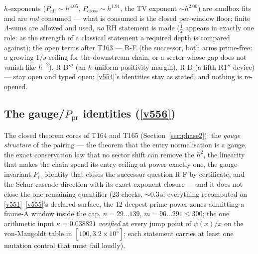 \documentclass[11pt,a4paper]{article}
\begin{document}
\begin{itemize}[leftmargin=1.5em]
$h$-exponents ($P_{\mathrm{aff}}\sim h^{3.05}$, $P_{\mathrm{cross}}\sim h^{1.91}$, the
TV exponent $\sim h^{2.00}$) are sandbox fits and are \emph{not} consumed --- what is
consumed is the closed per-window floor; finite $\Lambda$-sums are allowed and used,
\emph{no} RH statement is made ($\tfrac12$ appears in exactly one role: as the strength
of a classical statement a required depth is compared against); the open terms after
T163 --- R-E (the successor, both arms prime-free: a growing $1/s$ ceiling for the
downstream chain, or a sector whose gap does not vanish like $h^{-2}$), R-B$'''$ (an
$h$-uniform positivity margin), R-D (a fifth R1$''$ device) --- stay open and typed
open; \vref{v554}'s identities stay as stated, and nothing is re-opened.
\end{itemize}

\subsection{The gauge/\texorpdfstring{$P_{\mathrm{pr}}$}{Ppr} identities (\texorpdfstring{\vref{v556}}{v556})}\label{sec:v556}
The closed theorem cores of T164 and T165 (Section~\ref{sec:phase2}): the \emph{gauge
structure} of the pairing --- the theorem that the entry normalisation is a gauge, the
exact conservation law that no sector shift can remove the $h^2$, the linearity that makes
the chain spend its entry ceiling at power exactly one, the gauge-invariant
$P_{\mathrm{pr}}$ identity that closes the successor question R-F by certificate, and the
Schur-cascade direction with its exact exponent closure --- and it does not close the one
remaining quantifier
 ($23$ checks, ${\sim}0.3$\,s; everything recomputed
on \vref{v551}--\vref{v555}'s declared surface, the $12$ deepest prime-power zones
admitting a frame-A window inside the cap, $n=29\ldots139$, $m=96\ldots291\le300$; the one
arithmetic input $\kappa=0.038821$ \emph{verified} at every jump point of $\psi(x)/x$ on
the von-Mangoldt table in $[100,3.2\times10^{5}]$; each statement carries at least one
mutation control that must fail loudly).
\end{document}
